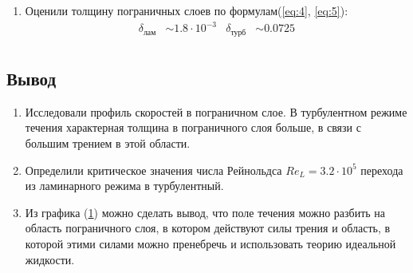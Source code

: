 \documentclass[12pt,a4paper]{article}
\begin{document}
\begin{enumerate}
\begin{figure}[h!]
        \caption{}
        \label{fig:3}
    \end{figure}
    \item Оценили толщину пограничных слоев по формулам(\ref{eq:4}, \ref{eq:5}):
    \begin{align*}
        \delta_{\text{лам}} &\sim  1.8 \cdot 10^{-3} & \delta_{\text{турб}} &\sim 0.0725 \\
    \end{align*}
    \end{enumerate}
    \subsection*{Вывод}
    \begin{enumerate}
        \item Исследовали профиль скоростей в пограничном слое. В турбулентном режиме течения характерная толщина в пограничного слоя больше, в связи с большим трением в этой области.
        \item Определили критическое значения числа Рейнольдса $Re_L = 3.2 \cdot 10^5$ перехода из ламинарного режима в турбулентный.
        \item Из графика (\ref{fig:3}) можно сделать вывод, что поле течения можно разбить на область пограничного слоя, в котором действуют силы трения и область, в которой этими силами можно пренебречь и использовать теорию идеальной жидкости. 
    \end{enumerate}
\end{document}
